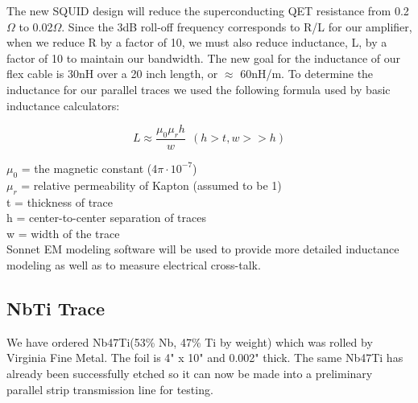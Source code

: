 \documentclass{report}
\begin{document}
The new SQUID design will reduce the superconducting QET resistance from 0.2$\Omega$ to 0.02$\Omega$. Since the 3dB roll-off frequency corresponds to R/L for our amplifier, when we reduce R by a factor of 10, we must also reduce inductance, L, by a factor of 10 to maintain our bandwidth. The new goal for the inductance of our flex cable is 30nH over a 20 inch length, or $\approx$ 60nH/m. To determine the inductance for our parallel traces we used the following formula used by basic inductance calculators:

$$ L \approx \frac{\mu_{0}\mu_{r}h}{w} \ \ (h > t , w >> h)$$

$\mu_{0}$ = the magnetic constant (4$\pi \cdot 10^{-7}$)\\
$\mu_{r}$ = relative permeability of Kapton (assumed to be 1)\\
t = thickness of trace \\
h = center-to-center separation of traces \\
w = width of the trace \\

Sonnet EM modeling software will be used to provide more detailed inductance modeling as well as to measure electrical cross-talk.

\subsection{NbTi Trace}

We have ordered Nb47Ti(53\% Nb, 47\% Ti by weight) which was rolled by Virginia Fine Metal. The foil is 4" x 10" and 0.002" thick. The same Nb47Ti has already been successfully etched so it can now be made into a preliminary parallel strip transmission line for testing.
\end{document}
